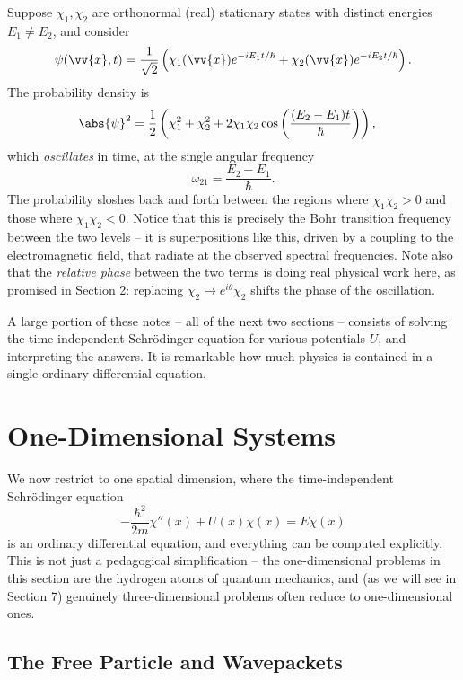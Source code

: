 \begin{example}
    Suppose $\chi_1, \chi_2$ are orthonormal (real) stationary states with distinct energies $E_1 \neq E_2$, and consider
    $$
    \psi(\vv{x}, t) = \frac{1}{\sqrt{2}}\left( \chi_1(\vv{x}) e^{-iE_1 t/\hbar} + \chi_2(\vv{x}) e^{-i E_2 t/\hbar} \right).
    $$
    The probability density is
    \begin{align*}
        \abs{\psi}^2 &= \frac{1}{2}\left( \chi_1^2 + \chi_2^2 + 2 \chi_1 \chi_2 \cos\left( \frac{(E_2 - E_1) t}{\hbar} \right) \right),
    \end{align*}
    which \emph{oscillates} in time, at the single angular frequency
    $$
    \omega_{21} = \frac{E_2 - E_1}{\hbar}.
    $$
    The probability sloshes back and forth between the regions where $\chi_1 \chi_2 > 0$ and those where $\chi_1 \chi_2 < 0$. Notice that this is precisely the Bohr transition frequency between the two levels -- it is superpositions like this, driven by a coupling to the electromagnetic field, that radiate at the observed spectral frequencies. Note also that the \emph{relative phase} between the two terms is doing real physical work here, as promised in Section 2: replacing $\chi_2 \mapsto e^{i\theta}\chi_2$ shifts the phase of the oscillation.
\end{example}

A large portion of these notes -- all of the next two sections -- consists of solving the time-independent Schr\"odinger equation for various potentials $U$, and interpreting the answers. It is remarkable how much physics is contained in a single ordinary differential equation.

\section{One-Dimensional Systems}

We now restrict to one spatial dimension, where the time-independent Schr\"odinger equation
$$
-\frac{\hbar^2}{2m} \chi''(x) + U(x) \chi(x) = E \chi(x)
$$
is an ordinary differential equation, and everything can be computed explicitly. This is not just a pedagogical simplification -- the one-dimensional problems in this section are the hydrogen atoms of quantum mechanics, and (as we will see in Section 7) genuinely three-dimensional problems often reduce to one-dimensional ones.

\subsection{The Free Particle and Wavepackets}

